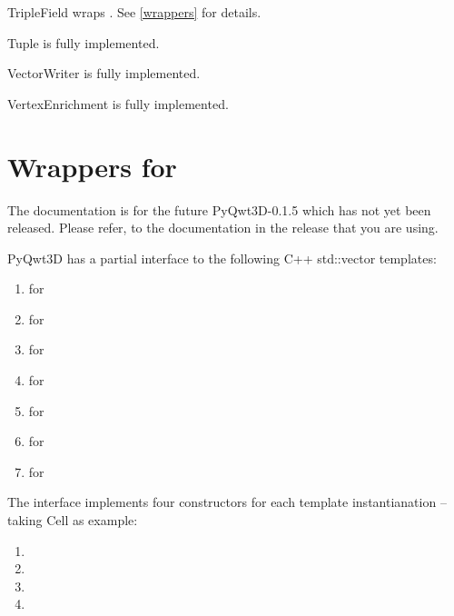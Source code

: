 \documentclass{manual}
\newcommand{\Future}{
  \begin{notice}[warning]
    The documentation is for the future PyQwt3D-0.1.5 which has not yet been
    released.  Please refer, to the documentation in the release that you are
    using.
  \end{notice}
}
\begin{document}
\begin{classdesc*}{TripleField}
wraps . See \ref{wrappers} for details.
\end{classdesc*}

\begin{classdesc*}{Tuple}
is fully implemented.
\end{classdesc*}

\begin{classdesc*}{VectorWriter}
is fully implemented.
\end{classdesc*}

\begin{classdesc*}{VertexEnrichment}
is fully implemented.
\end{classdesc*}

\section{Wrappers for  \label{wrappers}}

\Future{}

PyQwt3D has a partial interface to the following C++ std::vector templates:
\begin{enumerate}
\item
   for 
\item
   for 
\item
   for 
\item
   for 
\item
   for 
\item
   for 
\item
   for 
\end{enumerate}

The interface implements four constructors for each template instantianation --
taking Cell as example:
\begin{enumerate}
\item
\item
\item
\item
\end{enumerate}
\end{document}
